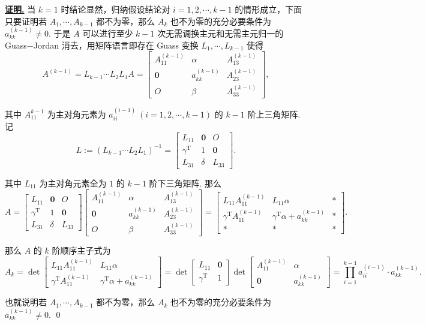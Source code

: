 \documentclass[10pt,openany]{article}
\theoremstyle{thmstyle} %
\theoremstyle{defstyle} %
\theoremstyle{prostyle} %
\theoremstyle{exastyle}
\theoremstyle{remstyle}
\renewenvironment{proof}[1][证明]{\par\underline{\textbf{#1.}} \;\fangsong}{\qed\par}
\newcommand{\T}{^{\text{T}}}
\begin{document}
\begin{proof}
	当 \( k=1 \) 时结论显然，归纳假设结论对 \( i=1,2,\cdots,k-1 \) 的情形成立，下面只要证明若 \( A_1,\cdots,A_{k-1} \) 都不为零，那么 \( A_k \) 也不为零的充分必要条件为 \( a_{kk}^{(k-1)} \neq 0 \). 于是 \( A \) 可以进行至少 \( k-1 \) 次无需调换主元和无需主元归一的 Guass\(-\)Jordan 消去，用矩阵语言即存在 Guass 变换 \( L_1,\cdots,L_{k-1} \) 使得
	\[ A^{(k-1)}=L_{k-1}\cdots L_2L_1A=\begin{bmatrix}
		A_{11}^{(k-1)} & \alpha & A_{13}^{(k-1)} \\
		\bm{0} &  a_{kk}^{(k-1)} & A_{23}^{(k-1)} \\
		O & \beta & A_{33}^{(k-1)}
	\end{bmatrix}, \]
	
	其中 \( A_{11}^{k-1} \) 为主对角元素为 \( a_{ii}^{(i-1)} \ (i=1,2,\cdots,k-1) \) 的 \( k-1 \) 阶上三角矩阵. 记 
	\[ L:=(L_{k-1}\cdots L_2L_1)^{-1}=\begin{bmatrix}
		L_{11} & \bm{0} & O \\
		\gamma\T & 1 & \bm{0} \\
		L_{31} & \delta & L_{33}
	\end{bmatrix}. \]
	
	其中 \( L_{11} \) 为主对角元素全为 \( 1 \) 的 \( k-1 \) 阶下三角矩阵. 那么
	\[ A=\begin{bmatrix}
		L_{11} & \bm{0} & O \\[1ex]
		\gamma\T & 1 & \bm{0} \\[1ex]
		L_{31} & \delta & L_{33}
	\end{bmatrix}\begin{bmatrix}
	A_{11}^{(k-1)} & \alpha & A_{13}^{(k-1)} \\[1ex]
	\bm{0} &  a_{kk}^{(k-1)} & A_{23}^{(k-1)} \\[1ex]
	O & \beta & A_{33}^{(k-1)}
	\end{bmatrix}= \begin{bmatrix}
	L_{11}A_{11}^{(k-1)} & L_{11}\alpha & * \\[1ex]
	\gamma\T A_{11}^{(k-1)} & \gamma\T \alpha+ a_{kk}^{(k-1)} & * \\[1ex]
	* & * & *
	\end{bmatrix}. \]
	
	那么 \( A \) 的 \( k \) 阶顺序主子式为
	\[ A_k= \det \begin{bmatrix}
		L_{11}A_{11}^{(k-1)} & L_{11}\alpha  \\[1ex]
		\gamma\T A_{11}^{(k-1)} & \gamma\T \alpha+ a_{kk}^{(k-1)} 
	\end{bmatrix}= \det\begin{bmatrix}
	  L_{11} & \bm{0} \\[1ex]
	  \gamma\T & 1
	\end{bmatrix} \det \begin{bmatrix}
	  A_{11}^{(k-1)} & \alpha \\[1ex]
	  \bm{0} & a_{kk}^{(k-1)}
	\end{bmatrix}= \prod_{i=1}^{k-1} a_{ii}^{(i-1)} \cdot a_{kk}^{(k-1)}. \]
	
	也就说明若 \( A_1,\cdots,A_{k-1} \) 都不为零，那么 \( A_k \) 也不为零的充分必要条件为 \( a_{kk}^{(k-1)} \neq 0 \).
\end{proof}
\end{document}

